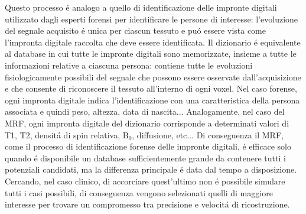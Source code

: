 \documentclass[a4paper,10pt]{article}
\begin{document}
 Questo processo \'e analogo a quello di identificazione delle impronte digitali utilizzato dagli esperti forensi per identificare le persone di interesse: l'evoluzione del segnale acquisito \'e unica per ciascun tessuto e pu\'o essere vista come l'impronta digitale raccolta che deve essere identificata. Il dizionario \'e equivalente al database in cui tutte le impronte digitali sono memorizzate, insieme a tutte le informazioni relative a ciascuna persona: contiene tutte le evoluzioni fisiologicamente possibili del segnale che possono essere osservate dall'acquisizione e che consente di riconoscere il tessuto all'interno di ogni voxel. Nel caso forense, ogni impronta digitale indica l'identificazione con una caratteristica della persona associata e quindi peso, altezza, data di nascita... Analogamente, nel caso del MRF, ogni impronta digitale del dizionario corrisponde a determinati valori di T1, T2, densit\'a di spin relativa, $\mbox{B}_0$, diffusione, etc... Di conseguenza il MRF, come il processo di identificazione forense delle impronte digitali, \'e efficace solo quando \'e disponibile un database sufficientemente grande da contenere tutti i potenziali candidati, ma la differenza principale \'e data dal tempo a disposizione. Cercando, nel caso clinico, di accorciare quest'ultimo non \'e possibile simulare tutti i casi possibili, di conseguenza vengono selezionati quelli di maggiore interesse per trovare un compromesso tra precisione e velocit\'a di ricostruzione. 
 
\end{document}
